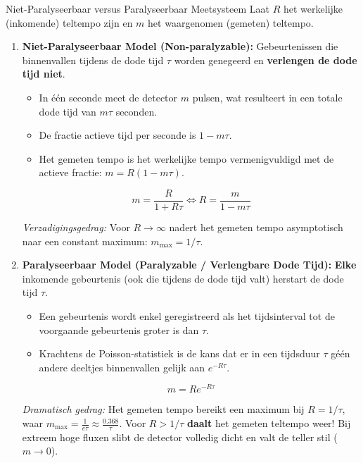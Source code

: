 \documentclass[11pt,a4paper]{article}
\begin{document}
\begin{defbox}{Niet-Paralyseerbaar versus Paralyseerbaar Meetsysteem}
Laat $R$ het werkelijke (inkomende) teltempo zijn en $m$ het waargenomen (gemeten) teltempo.
\begin{enumerate}[leftmargin=1.2em]
    \item \textbf{Niet-Paralyseerbaar Model (Non-paralyzable):}
    Gebeurtenissen die binnenvallen tijdens de dode tijd $\tau$ worden genegeerd en \textbf{verlengen de dode tijd niet}.
    \begin{itemize}
        \item In één seconde meet de detector $m$ pulsen, wat resulteert in een totale dode tijd van $m\tau$ seconden.
        \item De fractie actieve tijd per seconde is $1 - m\tau$.
        \item Het gemeten tempo is het werkelijke tempo vermenigvuldigd met de actieve fractie: $m = R(1 - m\tau)$.
    \end{itemize}
    \begin{formulabox}
    \begin{equation}
        m = \frac{R}{1 + R\tau} \iff R = \frac{m}{1 - m\tau}
    \end{equation}
    \end{formulabox}
    \emph{Verzadigingsgedrag:} Voor $R \to \infty$ nadert het gemeten tempo asymptotisch naar een constant maximum: $m_{\max} = 1/\tau$.

    \item \textbf{Paralyseerbaar Model (Paralyzable / Verlengbare Dode Tijd):}
    \textbf{Elke} inkomende gebeurtenis (ook die tijdens de dode tijd valt) herstart de dode tijd $\tau$.
    \begin{itemize}
        \item Een gebeurtenis wordt enkel geregistreerd als het tijdsinterval tot de voorgaande gebeurtenis groter is dan $\tau$.
        \item Krachtens de Poisson-statistiek is de kans dat er in een tijdsduur $\tau$ géén andere deeltjes binnenvallen gelijk aan $e^{-R\tau}$.
    \end{itemize}
    \begin{formulabox}
    \begin{equation}
        m = R e^{-R\tau}
    \end{equation}
    \end{formulabox}
    \emph{Dramatisch gedrag:} Het gemeten tempo bereikt een maximum bij $R = 1/\tau$, waar $m_{\max} = \frac{1}{e\tau} \approx \frac{0.368}{\tau}$. Voor $R > 1/\tau$ \textbf{daalt} het gemeten teltempo weer! Bij extreem hoge fluxen slibt de detector volledig dicht en valt de teller stil ($m \to 0$).
\end{enumerate}
\end{defbox}
\end{document}

